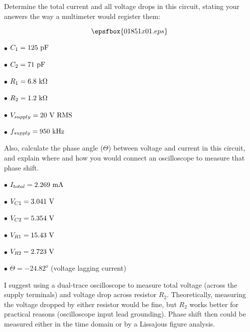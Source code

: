 

Determine the total current and all voltage drops in this circuit, stating your answers the way a multimeter would register them:

$$\epsfbox{01851x01.eps}$$

\goodbreak

\item{$\bullet$} $C_1 = 125 \hbox{ pF}$
\item{$\bullet$} $C_2 = 71 \hbox{ pF}$
\item{$\bullet$} $R_1 = 6.8 \hbox{ k}\Omega$
\item{$\bullet$} $R_2 = 1.2 \hbox{ k}\Omega$
\item{$\bullet$} $V_{supply} = 20 \hbox{ V RMS}$
\item{$\bullet$} $f_{supply} = 950 \hbox{ kHz}$

\vskip 10pt

Also, calculate the phase angle ($\Theta$) between voltage and current in this circuit, and explain where and how you would connect an oscilloscope to measure that phase shift.







\item{$\bullet$} $I_{total} = 2.269 \hbox{ mA}$
\item{$\bullet$} $V_{C1} = 3.041 \hbox{ V}$
\item{$\bullet$} $V_{C2} = 5.354 \hbox{ V}$
\item{$\bullet$} $V_{R1} = 15.43 \hbox{ V}$
\item{$\bullet$} $V_{R2} = 2.723 \hbox{ V}$
\item{$\bullet$} $\Theta = -24.82^o$ (voltage lagging current)
\medskip

I suggest using a dual-trace oscilloscope to measure total voltage (across the supply terminals) and voltage drop across resistor $R_2$.  Theoretically, measuring the voltage dropped by either resistor would be fine, but $R_2$ works better for practical reasons (oscilloscope input lead grounding).  Phase shift then could be measured either in the time domain or by a Lissajous figure analysis.

